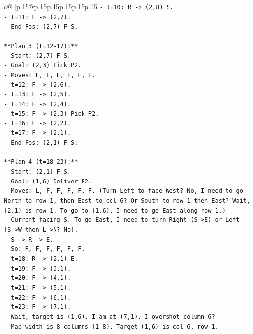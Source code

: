 \documentclass{article}
\begin{document}
{\begin{supertabular}{c@{$\;$}|p{.15\linewidth}@{}p{.15\linewidth}p{.15\linewidth}p{.15\linewidth}p{.15\linewidth}p{.15\linewidth}}
{{{\texttt{{-} t=10: R {-}> (2,8) S.} \\
\texttt{{-} t=11: F {-}> (2,7).} \\
\texttt{{-} End Pos: (2,7) F S.} \\
\\ 
\texttt{**Plan 3 (t=12{-}17):**} \\
\texttt{{-} Start: (2,7) F S.} \\
\texttt{{-} Goal: (2,3) Pick P2.} \\
\texttt{{-} Moves: F, F, F, F, F, F.} \\
\texttt{{-} t=12: F {-}> (2,6).} \\
\texttt{{-} t=13: F {-}> (2,5).} \\
\texttt{{-} t=14: F {-}> (2,4).} \\
\texttt{{-} t=15: F {-}> (2,3) Pick P2.} \\
\texttt{{-} t=16: F {-}> (2,2).} \\
\texttt{{-} t=17: F {-}> (2,1).} \\
\texttt{{-} End Pos: (2,1) F S.} \\
\\ 
\texttt{**Plan 4 (t=18{-}23):**} \\
\texttt{{-} Start: (2,1) F S.} \\
\texttt{{-} Goal: (1,6) Deliver P2.} \\
\texttt{{-} Moves: L, F, F, F, F, F. (Turn Left to face West? No, I need to go North to row 1, then East to col 6? Or South to row 1 then East? Wait, (2,1) is row 1. To go to (1,6), I need to go East along row 1.)} \\
\texttt{{-} Current facing S. To go East, I need to turn Right (S{-}>E) or Left (S{-}>W then L{-}>N? No).} \\
\texttt{{-} S {-}> R {-}> E.} \\
\texttt{{-} So: R, F, F, F, F, F.} \\
\texttt{{-} t=18: R {-}> (2,1) E.} \\
\texttt{{-} t=19: F {-}> (3,1).} \\
\texttt{{-} t=20: F {-}> (4,1).} \\
\texttt{{-} t=21: F {-}> (5,1).} \\
\texttt{{-} t=22: F {-}> (6,1).} \\
\texttt{{-} t=23: F {-}> (7,1).} \\
\texttt{{-} Wait, target is (1,6). I am at (7,1). I overshot column 6?} \\
\texttt{{-} Map width is 8 columns (1{-}8). Target (1,6) is col 6, row 1.} \\
}}}
\end{supertabular}}
\end{document}
